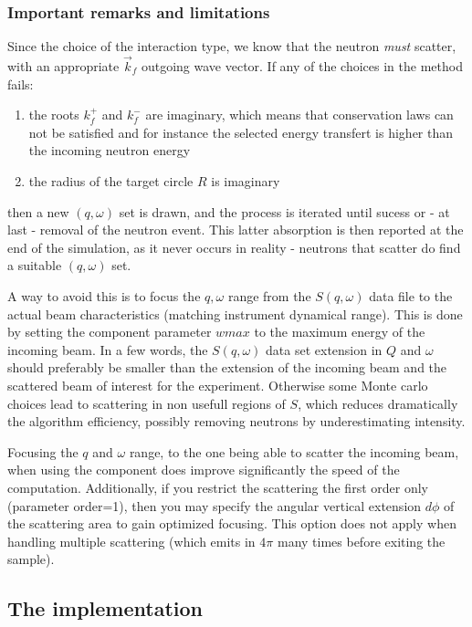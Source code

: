 \subsubsection{Important remarks and limitations}

Since the choice of the interaction type, we know that the neutron \emph{must} scatter, with an appropriate $\vec k_f$ outgoing wave vector. If any of the choices in the method fails:
\begin{enumerate}
\item the roots $k_f^+$ and $k_f^-$ are imaginary, which means that conservation laws can not be satisfied and for instance the selected energy transfert is higher than the incoming neutron energy
\item the radius of the target circle $R$ is imaginary
\end{enumerate}
then a new $(q, \omega)$ set is drawn, and the process is iterated until sucess or - at last - removal of the neutron event. This latter absorption is then reported at the end of the simulation, as it never occurs in reality - neutrons that scatter do find a suitable $(q, \omega)$ set.

A way to avoid this is to focus the $q,\omega$ range from the $S(q, \omega)$ data file to the actual beam characteristics (matching instrument dynamical range). This is done by setting the component parameter $wmax$ to the maximum energy of the incoming beam. In a few words, the $S(q,\omega)$ data set extension in $Q$ and $\omega$ should preferably be smaller than the extension of the incoming beam and the scattered beam of interest for the experiment. Otherwise some Monte carlo choices lead to scattering in non usefull regions of $S$, which reduces dramatically the algorithm efficiency, possibly removing neutrons by underestimating intensity.

Focusing the $q$ and $\omega$ range, to the one being able to scatter the incoming beam, when using the component does improve significantly the speed of the computation. Additionally, if you restrict the scattering the first order only (parameter order=1), then you may specify the angular vertical extension $d\phi$ of the scattering area to gain optimized focusing. This option does not apply when handling multiple scattering (which emits in $4\pi$ many times before exiting the sample).

\subsection{The implementation}

